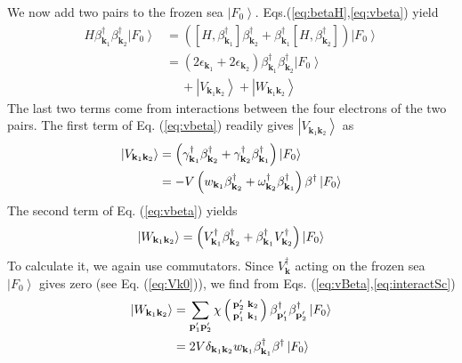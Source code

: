 \documentclass[epj]{svjour}
\newcommand{\vk}{\ensuremath{\mathbf{k}}}
\newcommand{\vp}{\ensuremath{\mathbf{p}}}
\begin{document}
We now add two pairs to the frozen sea $\left|F_0\right>$. Eqs.(\ref{eq:betaH},\ref{eq:vbeta}) yield 
\begin{equation}  \label{eq:SchTwo}
\begin{split}
H\beta^{\dagger}_{\mathbf{k} _1}\beta^{\dagger}_{\mathbf{k}
_2}\left|F_0\right>   &=\left(\left[H,\beta^{\dagger}_{\mathbf{k} _1}\right]
\beta^{\dagger}_{\mathbf{k} _2}+\beta^{\dagger}_{\mathbf{k} _1}\left[%
H,\beta^{\dagger}_{\mathbf{k} _2}\right]  \right) \left|F_0\right>   \\
&=\left(2\epsilon_{\mathbf{k} _1}+2\epsilon_{\mathbf{k} _2}\right)
\beta^{\dagger}_{\mathbf{k} _1}\beta^{\dagger}_{\mathbf{k}
_2}\left|F_0\right>\\
&\quad\:   +\left|V_{\mathbf{k} _1\mathbf{k} _2}\right>+\left|W_{\mathbf{k} _1\mathbf{k} _2}\right>  
\end{split}%
\end{equation}
The last two terms come from interactions between the four electrons of the two pairs.  The first term of Eq. (\ref{eq:vbeta}) readily gives $\left|V_{\mathbf{k} _1\mathbf{k} _2}\right> $ as 
\begin{equation}
\begin{split}
\left|V_{\mathbf{k} _1\mathbf{k} _2}\right>& =\left(\gamma^{\dagger}_{\mathbf{%
k} _1}\beta^{\dagger}_{\mathbf{k} _2}+\gamma^{\dagger}_{\mathbf{k}
_2}\beta^{\dagger}_{\mathbf{k} _1}\right) \left|F_0\right> \\
&=-V\left(w_{\mathbf{k} _1}\beta^{\dagger}_{\mathbf{k} _2}+\omega^{\dagger}_{\mathbf{k}
_2}\beta^{\dagger}_{\mathbf{k} _1}\right)\beta^\dagger \left|F_0\right>  
\end{split}
\end{equation}
The second term of Eq. (\ref{eq:vbeta}) yields
\begin{equation}
\left|W_{\mathbf{k} _1\mathbf{k} _2}\right> =\left(V^{\dagger}_{\mathbf{%
k} _1}\beta^{\dagger}_{\mathbf{k} _2}+\beta^{\dagger}_{\mathbf{k}
_1}V^{\dagger}_{\mathbf{k} _2}\right) \left|F_0\right> 
\end{equation}
To calculate it, we again use commutators.  Since  $V^{\dagger}_{\mathbf{k}}$ acting on the frozen sea $\left|F_0\right>$ gives zero (see Eq. (\ref{eq:Vk0})), we find from Eqs. (\ref{eq:vBeta},\ref{eq:interactSc}) 
\begin{equation}\label{eq:omega2}
\begin{split}
\left|W_{\mathbf{k} _1\mathbf{k} _2}\right>&=\sum_{\mathbf{p} ^{\prime}_1\mathbf{p}
^{\prime}_2}\chi\left(\begin{smallmatrix}\vp'_2&\vk_2\\\vp'_1&\vk_1%
\end{smallmatrix}\right)  \beta^{\dagger}_{\mathbf{p} ^{\prime}_1}\beta^{%
\dagger}_{\mathbf{p} ^{\prime}_2}\left|F_0\right> \\
&=2V\delta_{\mathbf{k} _1\mathbf{k} _2}w_{\mathbf{k} _1}\beta^{\dagger}_{
\mathbf{k} _1} \beta^{\dagger}\left|F_0\right> 
\end{split}
\end{equation}
\end{document}
